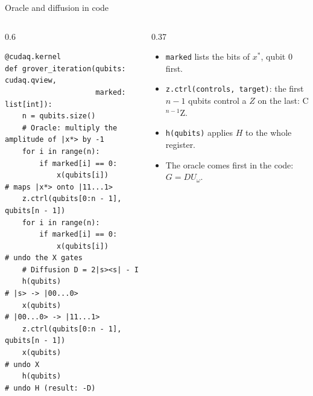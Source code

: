 \documentclass[aspectratio=169,11pt]{beamer}
\newcommand{\xs}{x^\ast}
\newcommand{\Uo}{U_\omega}
\begin{document}
\begin{frame}[fragile]{Oracle and diffusion in code}
  \begin{columns}[T]
    \begin{column}{0.6\textwidth}
\begin{lstlisting}
@cudaq.kernel
def grover_iteration(qubits: cudaq.qview,
                     marked: list[int]):
    n = qubits.size()
    # Oracle: multiply the amplitude of |x*> by -1
    for i in range(n):
        if marked[i] == 0:
            x(qubits[i])              # maps |x*> onto |11...1>
    z.ctrl(qubits[0:n - 1], qubits[n - 1])
    for i in range(n):
        if marked[i] == 0:
            x(qubits[i])              # undo the X gates
    # Diffusion D = 2|s><s| - I
    h(qubits)                         # |s> -> |00...0>
    x(qubits)                         # |00...0> -> |11...1>
    z.ctrl(qubits[0:n - 1], qubits[n - 1])
    x(qubits)                         # undo X
    h(qubits)                         # undo H (result: -D)
\end{lstlisting}
    \end{column}
    \begin{column}{0.37\textwidth}
      \small
      \begin{itemize}
        \item \texttt{marked} lists the bits of $\xs$, qubit 0 first.
        \item \texttt{z.ctrl(controls, target)}: the first $n - 1$ qubits control a $Z$ on the last: C$^{n-1}$Z.
        \item \texttt{h(qubits)} applies $H$ to the whole register.
        \item The oracle comes first in the code: $G = D\Uo$.
      \end{itemize}
    \end{column}
  \end{columns}
\end{frame}
\end{document}
